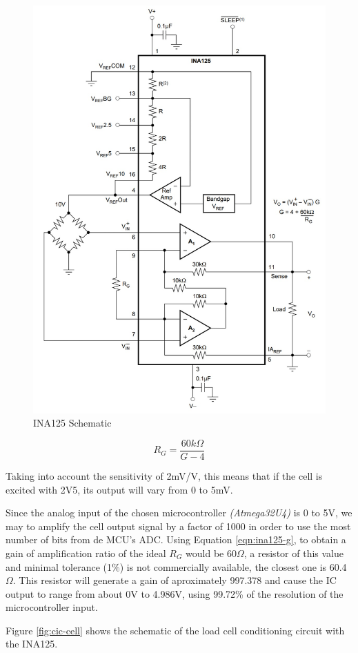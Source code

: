 	\begin{figure}[htbp]
		\centering
		\includegraphics[width=.6\textwidth]{figuras/fig-ina125-functional-block}
		\caption{INA125 Schematic \cite{ina125}}
		\label{fig:ina125-functional-block}
	\end{figure}

	\begin{equation}\label{eqn:ina125-g}
		R_{G}=\frac{60k\Omega}{G - 4}
	\end{equation}

	Taking into account the sensitivity of 2mV/V, this means that if the cell is excited with 2V5, its output will vary from 0 to 5mV.
	\par
	Since the analog input of the chosen microcontroller \textit{(Atmega32U4)} is 0 to 5V, we may to amplify the cell output signal by a factor of 1000 in order to use the most number of bits from de MCU's ADC. Using Equation \ref{eqn:ina125-g}, to obtain a gain of amplification ratio of the ideal $R_{G}$ would be 60$\Omega$, a resistor of this value and minimal tolerance (1$\%$) is not commercially available, the closest one is 60.4$\Omega$. This resistor will generate a gain of aproximately 997.378 and cause the IC output to range from about 0V to 4.986V, using 99.72\% of the resolution of the microcontroller input. 
	\par
	Figure \ref{fig:cic-cell} shows the schematic of the load cell conditioning circuit with the INA125.

